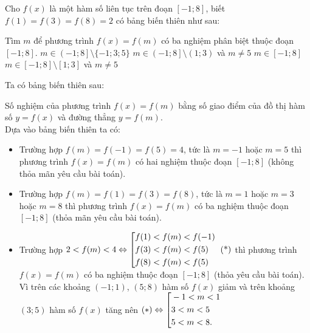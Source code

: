 \begin{ex}%
 Cho $f(x)$ là một hàm số liên tục trên đoạn $\left[-1;8\right]$, biết $f(1) = f(3) = f(8) = 2$ có bảng biến thiên như sau:
 \begin{center}
 \end{center}
 Tìm $m$ để phương trình $f(x) = f(m)$ có ba nghiệm phân biệt thuộc đoạn $\left[-1;8\right]$.
 \choice
  {$m \in \left(-1;8\right] \setminus \{-1;3;5\}$}
  {\True $m \in \left(-1;8\right] \setminus \left(1;3\right)$ và $m \neq 5$}
  {$m \in \left[-1;8\right]$}
  {$m \in \left[-1;8\right] \setminus \left[1;3\right]$ và $m \neq 5$}
 \loigiai
  {
  Ta có bảng biến thiên sau:
  \begin{center}
  \end{center}
  Số nghiệm của phương trình $f(x) = f(m)$ bằng số giao điểm của đồ thị hàm số $y = f(x)$ và đường thẳng $y = f(m)$.\\
  Dựa vào bảng biến thiên ta có:
  \begin{itemize}
   \item Trường hợp $f(m) = f(-1) = f(5) = 4$, tức là $m = -1$ hoặc $m = 5$ thì phương trình $f(x) = f(m)$ có hai nghiệm thuộc đoạn $\left[-1;8\right]$ (không thỏa mãn yêu cầu bài toán).
   \item Trường hợp $f(m) = f(1) = f(3) = f(8)$, tức là $m = 1$ hoặc $m = 3$ hoặc $m = 8$ thì phương trình $f(x) = f(m)$ có ba nghiệm thuộc đoạn $\left[-1;8\right]$ (thỏa mãn yêu cầu bài toán).
   \item Trường hợp $2 < f(m) < 4 \Leftrightarrow \left[\begin{aligned}& f(1) < f(m) < f(-1) \\& f(3) < f(m) < f(5) \\& f(8) < f(m) < f(5)\end{aligned}\right. \text{ (*)}$ thì phương trình $f(x) = f(m)$ có ba nghiệm thuộc đoạn $\left[-1;8\right]$ (thỏa yêu cầu bài toán).\\
   Vì trên các khoảng $(-1;1)$, $(5;8)$ hàm số $f(x)$ giảm và trên khoảng $(3;5)$ hàm số $f(x)$ tăng nên $(*) \Leftrightarrow \left[\begin{aligned}& -1 < m < 1 \\& 3 < m < 5 \\& 5 < m < 8.\end{aligned}\right.$

\end{itemize}}
\end{ex}
